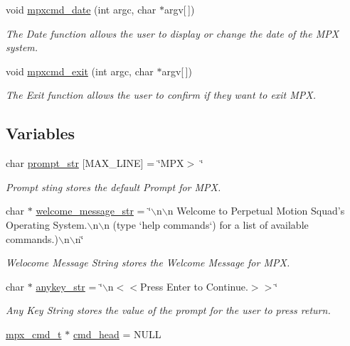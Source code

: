 \begin{DoxyCompactItemize}
void \hyperlink{_m_p_x___c_m_d_8_c_a8959742dda38733f33da60a56cb07373}{mpxcmd\_\-date} (int argc, char $\ast$argv\mbox{[}$\,$\mbox{]})
\begin{DoxyCompactList}\small\item\em The Date function allows the user to display or change the date of the MPX system. \item\end{DoxyCompactList}\item 
void \hyperlink{_m_p_x___c_m_d_8_c_ac303fbf0480d6050f91c6d7ac960d00c}{mpxcmd\_\-exit} (int argc, char $\ast$argv\mbox{[}$\,$\mbox{]})
\begin{DoxyCompactList}\small\item\em The Exit function allows the user to confirm if they want to exit MPX. \item\end{DoxyCompactList}\end{DoxyCompactItemize}
\subsection*{Variables}
\begin{DoxyCompactItemize}
\item 
char \hyperlink{_m_p_x___c_m_d_8_c_a4d455760d7d89fa6a1c1559f7b6acdf7}{prompt\_\-str} \mbox{[}MAX\_\-LINE\mbox{]} = \char`\"{}MPX$>$ \char`\"{}
\begin{DoxyCompactList}\small\item\em Prompt sting stores the default Prompt for MPX. \item\end{DoxyCompactList}\item 
char $\ast$ \hyperlink{_m_p_x___c_m_d_8_c_a9f8c83d01b06ce3619ac78c395f9cdd1}{welcome\_\-message\_\-str} = \char`\"{}$\backslash$n$\backslash$n Welcome to Perpetual Motion Squad's Operating System.$\backslash$n$\backslash$n (type `help commands`) for a list of available commands.)$\backslash$n$\backslash$n\char`\"{}
\begin{DoxyCompactList}\small\item\em Welocome Message String stores the Welcome Message for MPX. \item\end{DoxyCompactList}\item 
char $\ast$ \hyperlink{_m_p_x___c_m_d_8_c_a35b541517c624b5cabacaaa78ac41c70}{anykey\_\-str} = \char`\"{}$\backslash$n$<$$<$Press Enter to Continue.$>$$>$\char`\"{}
\begin{DoxyCompactList}\small\item\em Any Key String stores the value of the prompt for the user to press return. \item\end{DoxyCompactList}\item 
\hyperlink{structmpx__cmd}{mpx\_\-cmd\_\-t} $\ast$ \hyperlink{_m_p_x___c_m_d_8_c_af2d59668915a0a985c5301d887031811}{cmd\_\-head} = NULL
\end{DoxyCompactItemize}


